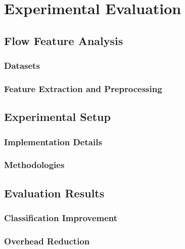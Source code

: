 \chapter{Experimental Evaluation}

\section{Flow Feature Analysis}

\subsection{Datasets}

\subsection{Feature Extraction and Preprocessing}

\section{Experimental Setup}

\subsection{Implementation Details}

\subsection{Methodologies}

\section{Evaluation Results}

\subsection{Classification Improvement}

\subsection{Overhead Reduction}